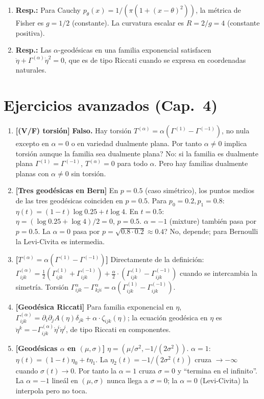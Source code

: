 \begin{enumerate}
	\item \textbf{Resp.:} Para Cauchy $p_\theta(x) = 1/(\pi(1+(x-\theta)^2))$, la métrica de Fisher es $g = 1/2$ (constante).  La curvatura escalar es $R = 2/g = 4$ (constante positiva).
	\item \textbf{Resp.:} Las $\alpha$-geodésicas en una familia exponencial satisfacen $\ddot\eta + \Gamma^{(\alpha)} \dot\eta^2 = 0$, que es de tipo Riccati cuando se expresa en coordenadas naturales.
\end{enumerate}

\section*{Ejercicios avanzados (Cap.~4)}
\begin{enumerate}
	\item \textbf{[(V/F) torsi\'on]} \textbf{Falso.} Hay torsi\'on $T^{(\alpha)}=\alpha(\Gamma^{(1)}-\Gamma^{(-1)})$, no nula excepto en $\alpha=0$ o en variedad dualmente plana. Por tanto $\alpha\ne 0$ implica torsi\'on aunque la familia sea dualmente plana? No: si la familia es dualmente plana $\Gamma^{(1)}=\Gamma^{(-1)}$, $T^{(\alpha)}=0$ para todo $\alpha$. Pero hay familias dualmente planas con $\alpha\ne 0$ sin torsi\'on.
	\item \textbf{[Tres geod\'esicas en Bern]} En $p=0.5$ (caso sim\'etrico), los puntos medios de las tres geod\'esicas coinciden en $p=0.5$. Para $p_0=0.2,p_1=0.8$: $\eta(t)=(1-t)\log 0.25+t\log 4$. En $t=0.5$: $\eta=(\log 0.25+\log 4)/2=0$, $p=0.5$. $\alpha=-1$ (mixture) tambi\'en pasa por $p=0.5$. La $\alpha=0$ pasa por $p=\sqrt{0.8\cdot 0.2}\approx 0.4$? No, depende; para Bernoulli la Levi-Civita es intermedia.
	\item \textbf{[$T^{(\alpha)}=\alpha(\Gamma^{(1)}-\Gamma^{(-1)})$]} Directamente de la definici\'on: $\Gamma^{(\alpha)}_{ijk}=\tfrac{1}{2}(\Gamma^{(1)}_{ijk}+\Gamma^{(-1)}_{ijk})+\tfrac{\alpha}{2}\cdot(\Gamma^{(1)}_{ijk}-\Gamma^{(-1)}_{ijk})$ cuando se intercambia la simetr\'ia. Torsi\'on $\Gamma^\alpha_{ijk}-\Gamma^\alpha_{kji}=\alpha(\Gamma^{(1)}_{ijk}-\Gamma^{(-1)}_{ijk})$.
	\item \textbf{[Geod\'esica Riccati]} Para familia exponencial en $\eta$, $\Gamma^{(\alpha)}_{ijk}=\partial_i\partial_j A(\eta)\delta_{jk}+\alpha\cdot\zeta_{ijk}(\eta)$; la ecuaci\'on geod\'esica en $\eta$ es $\ddot\eta^k=-\Gamma^{(\alpha)}_{ijk}\dot\eta^i\dot\eta^j$, de tipo Riccati en componentes.
	\item \textbf{[Geod\'esicas $\alpha$ en $(\mu,\sigma)$]} $\eta=(\mu/\sigma^2, -1/(2\sigma^2))$. $\alpha=1$: $\eta(t)=(1-t)\eta_0+t\eta_1$. La $\eta_2(t)=-1/(2\sigma^2(t))$ cruza $\to-\infty$ cuando $\sigma(t)\to 0$. Por tanto la $\alpha=1$ cruza $\sigma=0$ y ``termina en el infinito''. La $\alpha=-1$ line\'al en $(\mu,\sigma)$ nunca llega a $\sigma=0$; la $\alpha=0$ (Levi-Civita) la interpola pero no toca.
\end{enumerate}


